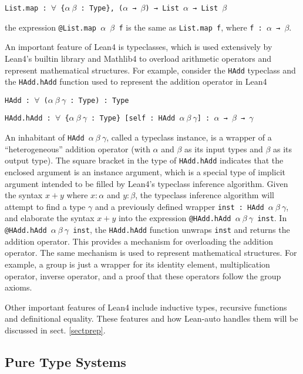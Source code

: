   \centerline{\texttt{List.map : $\forall$ \{$\alpha \ \beta$ : Type\}, ($\alpha$ → $\beta$) → List $\alpha$ → List $\beta$}}
  
  \noindent the expression \texttt{@List.map $\alpha$ $\beta$ f} is the same as \texttt{List.map f}, where \texttt{f : $\alpha$ → $\beta$}.

  An important feature of Lean4 is typeclasses, which is used extensively by
  Lean4's builtin library and Mathlib4 to overload arithmetic operators and represent
  mathematical structures. For example, consider the \texttt{HAdd} typeclass
  and the \texttt{HAdd.hAdd} function used to represent the addition operator in Lean4
  
  \centerline{\texttt{HAdd : $\forall$ ($\alpha \ \beta \ \gamma$ : Type) : Type}}
  \centerline{\texttt{HAdd.hAdd : $\forall$ \{$\alpha \ \beta \ \gamma$ : Type\} [self : HAdd $\alpha \ \beta \ \gamma$] : $\alpha$ → $\beta$ → $\gamma$}}

  \noindent An inhabitant of \texttt{HAdd $\alpha \ \beta \ \gamma$}, called a
  typeclass instance, is a wrapper of a ``heterogeneous'' addition operator (with $\alpha$ and $\beta$ as its input types and
  $\beta$ as its output type). The square bracket in the type of \texttt{HAdd.hAdd}
  indicates that the enclosed argument is an instance argument, which is a special type
  of implicit argument intended to be filled by Lean4's typeclass inference algorithm.
  Given the syntax $x + y$ where $x : \alpha$ and $y : \beta$,
  the typeclass inference algorithm will attempt to find a type $\gamma$ and a previously
  defined wrapper \texttt{inst : HAdd $\alpha \ \beta \ \gamma$}, and elaborate the
  syntax $x + y$ into the expression \texttt{@HAdd.hAdd $\alpha \ \beta \ \gamma$ inst}.
  In \texttt{@HAdd.hAdd $\alpha \ \beta \ \gamma$ inst}, the \texttt{HAdd.hAdd} function
  unwraps \texttt{inst} and returns the addition operator. This provides a mechanism
  for overloading the addition operator. The same mechanism is used to represent mathematical
  structures. For example, a group is just a wrapper for its identity element, multiplication
  operator, inverse operator, and a proof that these operators follow the group axioms.

  \noindent Other important features of Lean4 include inductive types, recursive functions
  and definitional equality. These features and how Lean-auto handles them will be discussed
  in sect. \ref{sectprep}.

\subsection{Pure Type Systems}\label{sectpts}

